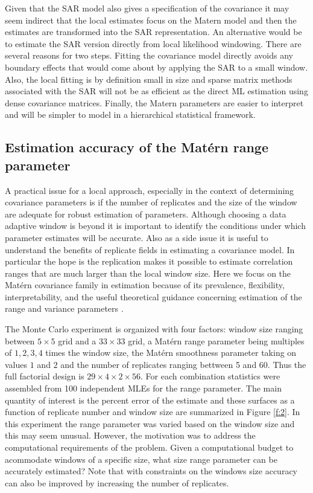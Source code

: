 \documentclass[review]{elsarticle}
\begin{document}
Given that the SAR model also gives a specification of the covariance it may seem indirect that the local estimates focus on the Matern model and then the estimates are transformed into the SAR representation. An alternative would be to estimate the SAR version directly from local likelihood windowing. There are several  reasons for two steps. Fitting the covariance model directly avoids any boundary effects that would come about by applying the SAR to a small window. Also, the local fitting is by definition small in size and sparse matrix methods associated with the SAR will not be as efficient as the direct ML estimation using dense covariance matrices.  Finally, the Matern parameters are easier to interpret and will be simpler to model  in a hierarchical statistical framework. 

\subsection{Estimation accuracy of the Mat\'ern range parameter}
\label{ss:2}
A practical issue for a local approach, especially in the context of determining covariance parameters  is if the number of replicates and the size of the window are adequate for robust estimation of  parameters. 
Although choosing a data adaptive window is beyond it is important to identify the conditions under which parameter estimates will be accurate.  Also as a side issue it is useful to understand the benefits of replicate fields in estimating a covariance model. In particular the hope is the replication makes it possible to estimate correlation ranges that are much larger than the local window size. 
Here we  focus on the Mat\'ern covariance family in estimation because of its prevalence, flexibility, interpretability,  and the useful theoretical guidance  concerning estimation of the range and variance parameters \cite{kaufman2013role}. 

The Monte Carlo experiment is organized with four factors: window size ranging between 
 $5 \times 5$ grid and a $33 \times 33$ grid, a Mat\'ern range parameter being multiples of $1,2,3,4$ times the window size, 
 the  Mat\'ern smoothness  parameter taking on values $1$ and $2$  and  the number of replicates ranging bettween 5 and 60.  Thus the full factorial design is $29 \times 4 \times 2 \times 56$. 
For each combination statistics were assembled from 100 independent MLEs for the range parameter. 
 The  main quantity of interest is the percent error of the estimate and these surfaces as a function of replicate number and window size are summarized in Figure \ref{f:2}.  In this experiment the range parameter was varied based on the window size and this  may seem unusual.  However, the motivation was to address the computational requirements of the problem. Given a computational budget to acommodate windows of a specific size, what size range parameter can be accurately estimated? Note that with constraints on the windows size accuracy can also be improved by increasing the number of replicates. 
\end{document}
